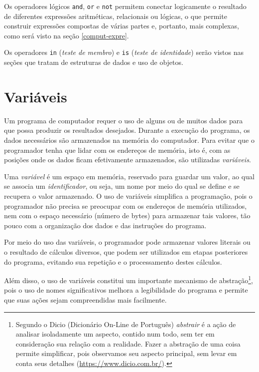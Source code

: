 \documentclass[
]{book}
\begin{document}
Os operadores lógicos \texttt{and}, \texttt{or} e \texttt{not} permitem conectar logicamente o resultado de diferentes expressões aritméticas, relacionais ou lógicas, o que permite construir expressões compostas de várias partes e, portanto, mais complexas, como será visto na seção \ref{comput-expre}.

Os operadores \texttt{in} (\emph{teste de membro}) e \texttt{is} (\emph{teste de identidade}) serão vistos nas seções que tratam de estruturas de dados e uso de objetos.

\hypertarget{comput-varia}{%
\section{Variáveis}\label{comput-varia}}

Um programa de computador requer o uso de alguns ou de muitos dados para que possa produzir os resultados desejados. Durante a execução do programa, os dados necessários são armazenados na memória do computador. Para evitar que o programador tenha que lidar com os endereços de memória, isto é, com as posições onde os dados ficam efetivamente armazenados, são utilizadas \emph{variáveis}.

Uma \emph{variável} é um espaço em memória, reservado para guardar um valor, ao qual se associa um \emph{identificador}, ou seja, um nome por meio do qual se define e se recupera o valor armazenado. O uso de variáveis simplifica a programação, pois o programador não precisa se preocupar com os endereços de memória utilizados, nem com o espaço necessário (número de bytes) para armazenar tais valores, tão pouco com a organização dos dados e das instruções do programa.

Por meio do uso das variáveis, o programador pode armazenar valores literais ou o resultado de cálculos diversos, que podem ser utilizados em etapas posteriores do programa, evitando sua repetição e o processamento destes cálculos.

Além disso, o uso de variáveis constitui um importante mecanismo de abstração\footnote{Segundo o Dicio (Dicionário On-Line de Português) \emph{abstrair} é a ação de analisar isoladamente um aspecto, contido num todo, sem ter em consideração sua relação com a realidade. Fazer a abstração de uma coisa permite simplificar, pois observamos seu aspecto principal, sem levar em conta seus detalhes (\url{https://www.dicio.com.br/}).}, pois o uso de nomes significativos melhora a legibilidade do programa e permite que suas ações sejam compreendidas mais facilmente.
\end{document}
